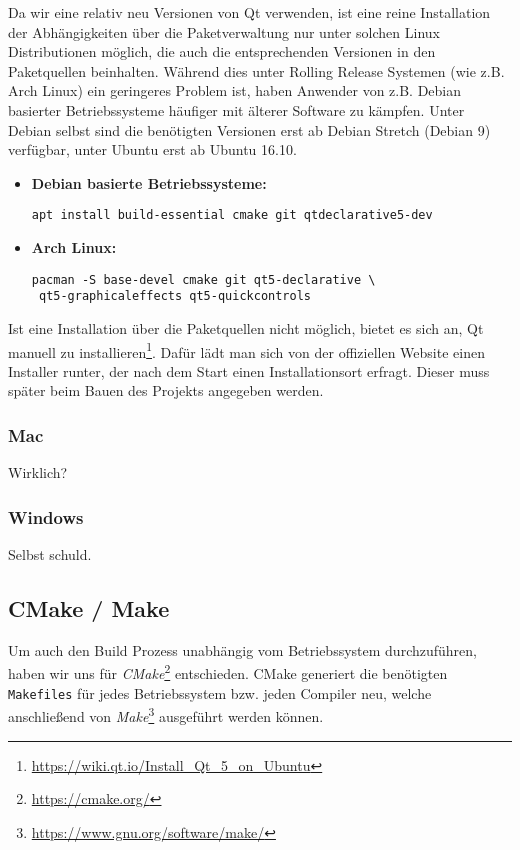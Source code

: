 Da wir eine relativ neu Versionen von Qt verwenden, ist eine reine Installation der
Abhängigkeiten über die Paketverwaltung nur unter solchen Linux Distributionen möglich,
die auch die entsprechenden Versionen in den Paketquellen beinhalten. Während dies unter
Rolling Release Systemen (wie z.B. Arch Linux) ein geringeres Problem ist, haben Anwender von
z.B. Debian basierter Betriebssysteme häufiger mit älterer Software zu kämpfen.
Unter Debian selbst sind die benötigten Versionen erst ab Debian Stretch (Debian 9)
verfügbar, unter Ubuntu erst ab Ubuntu 16.10.

\begin{itemize}
	\item \textbf{Debian basierte Betriebssysteme:} \\
	\begin{lstlisting}
apt install build-essential cmake git qtdeclarative5-dev
	\end{lstlisting}

	\item \textbf{Arch Linux:} \\
	\begin{lstlisting}
pacman -S base-devel cmake git qt5-declarative \
 qt5-graphicaleffects qt5-quickcontrols
	\end{lstlisting}
\end{itemize}

Ist eine Installation über die Paketquellen nicht möglich, bietet es sich an, Qt manuell
zu installieren\footnote{\url{https://wiki.qt.io/Install_Qt_5_on_Ubuntu}}. Dafür lädt
man sich von der offiziellen Website einen Installer runter, der nach dem Start einen
Installationsort erfragt. Dieser muss später beim Bauen des Projekts angegeben werden.



\subsubsection{Mac}

Wirklich?

\subsubsection{Windows}

Selbst schuld.

\subsection{CMake / Make}
\label{dev-report-cmake-build}
Um auch den Build Prozess unabhängig vom Betriebssystem durchzuführen, haben wir uns für
\textit{CMake}\footnote{\url{https://cmake.org/}} entschieden. CMake generiert die benötigten
\texttt{Makefiles} für jedes Betriebssystem bzw. jeden Compiler neu, welche anschließend
von \textit{Make}\footnote{\url{https://www.gnu.org/software/make/}} ausgeführt werden können.

